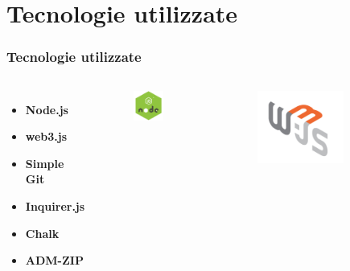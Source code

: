 \documentclass{beamer}
\begin{document}
\section{Tecnologie utilizzate}

\begin{frame}
	\frametitle{Tecnologie utilizzate}
	\begin{columns}
		\begin{itemize}
			\item \textbf{Node.js}
			\item \textbf{web3.js}
			\item \textbf{Simple Git}
			\item \textbf{Inquirer.js}
			\item \textbf{Chalk}
			\item \textbf{ADM-ZIP}
		\end{itemize}
		\centering
		\begin{figure}
			\includegraphics[width=0.7\textwidth]{figures/node.png}
		\end{figure}
		\begin{figure}
			\includegraphics[width=0.7\textwidth]{figures/web3.jpg}

\end{figure}
\end{columns}
\end{frame}
\end{document}
